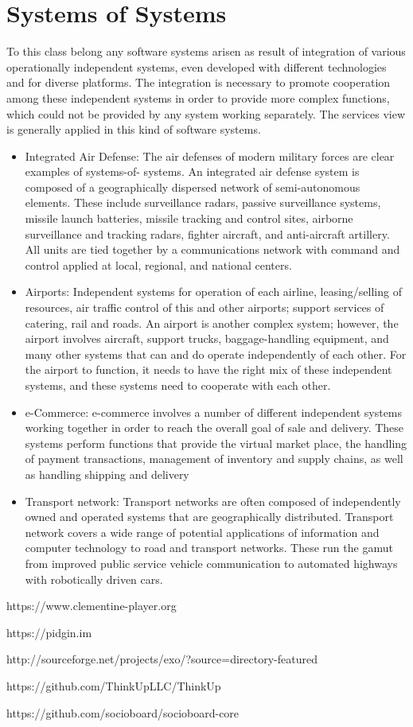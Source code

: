 \chapter{Systems of Systems}\label{ch:SoS}
To this class belong any software systems arisen as result of integration of various operationally independent systems, even developed with different technologies and for diverse platforms. The integration is necessary to promote cooperation among these independent systems in order to provide more complex functions, which could not be provided by any system working separately. The services view is generally applied in this kind of software systems.
\begin{itemize}                                           	
\item Integrated Air Defense: The air defenses of modern military forces are
clear examples of systems-of- systems. An integrated air defense system is composed of a geographically dispersed network of semi-autonomous elements. These include surveillance radars, passive surveillance systems, missile launch batteries, missile tracking and control sites, airborne surveillance and tracking radars, fighter aircraft, and anti-aircraft artillery. All units are tied together by a communications network with command and control applied at local, regional, and national centers.
 
\item Airports: Independent systems for operation of each airline,
leasing/selling of resources, air traffic control of this and other airports; support services of catering, rail and roads. An airport is another complex system; however, the airport involves aircraft, support trucks, baggage-handling equipment, and many other systems that can and do operate independently of each other. For the airport to function, it needs to have the right mix of these independent systems, and these systems need to cooperate with each other.
 
\item e-Commerce: e-commerce involves a number of different independent systems
working together in order to reach the overall goal of sale and delivery. These systems perform functions that provide the virtual market place, the handling of payment transactions, management of inventory and supply chains, as well as handling shipping and delivery
                                            	
\item Transport network: Transport networks are often composed of independently
owned and operated systems that are geographically distributed.  Transport network covers a wide range of potential applications of information and computer technology to road and transport networks. These run the gamut from improved public service vehicle communication to automated highways with robotically driven cars.
\end{itemize}


https://www.clementine-player.org

https://pidgin.im

http://sourceforge.net/projects/exo/?source=directory-featured

https://github.com/ThinkUpLLC/ThinkUp

https://github.com/socioboard/socioboard-core